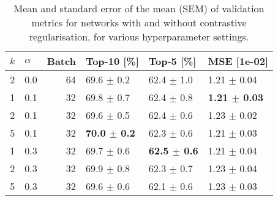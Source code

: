 \begin{table}[h]
\caption{Mean and standard error of the mean (SEM) of validation metrics for networks with and without contrastive regularisation, for various hyperparameter settings.}
\label{tab:cr_32}
\begin{tabular}{rlrlll}
\toprule
$k$ & $\alpha$ & Batch & Top-10 [\%] & Top-5 [\%] & MSE [1e-02] \\
\midrule
2 & 0.0 & 64 & 69.6 $\pm$ 0.2 & 62.4 $\pm$ 1.0 & 1.21 $\pm$ 0.04 \\
1 & 0.1 & 32 & 69.8 $\pm$ 0.7 & 62.4 $\pm$ 0.8 & \textbf{1.21 $\pm$ 0.03} \\
2 & 0.1 & 32 & 69.6 $\pm$ 0.5 & 62.4 $\pm$ 0.6 & 1.23 $\pm$ 0.02 \\
5 & 0.1 & 32 & \textbf{70.0 $\pm$ 0.2} & 62.3 $\pm$ 0.6 & 1.21 $\pm$ 0.03 \\
1 & 0.3 & 32 & 69.7 $\pm$ 0.6 & \textbf{62.5 $\pm$ 0.6} & 1.21 $\pm$ 0.04 \\
2 & 0.3 & 32 & 69.9 $\pm$ 0.8 & 62.3 $\pm$ 0.7 & 1.23 $\pm$ 0.04 \\
5 & 0.3 & 32 & 69.6 $\pm$ 0.6 & 62.1 $\pm$ 0.6 & 1.23 $\pm$ 0.03 \\
\bottomrule
\end{tabular}
\end{table}

